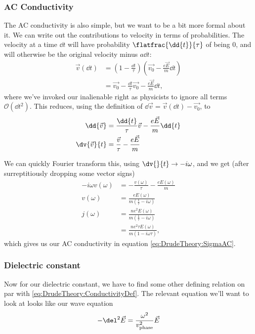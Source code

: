 \documentclass[../../main.tex]{subfiles}
\begin{document}
\subsubsection{AC Conductivity} 

The AC conductivity is also simple, but we want to be a bit more formal about it. We can write out the contributions to velocity in terms of probabilities. The velocity at a time $\dd{t}$ will have probability $\flatfrac{\dd{t}}{\tau}$ of being $0$, and will otherwise be the original velocity minus $a \dd{t}$:
\begin{align}
	\vec{v}(\dd{t}) &= \left(1 - \frac{\dd{t}}{\tau}\right) \left(\vec{v_0} - \frac{e \vec{E}}{m} \dd{t} \right) \\
	&= \vec{v_0} - \frac{\dd{t}}{\tau}\vec{v_0} - \frac{e \vec{E}}{m} \dd{t},
\end{align}
where we've invoked our inalienable right as physicists to ignore all terms $\mathcal{O}(\dd{t}^2)$.
This reduces, using the definition of $\dd{\vec{v}} = \vec{v}(\dd{t}) - \vec{v_0}$, to
\begin{align}
	\dd{\vec{v}} &=  \frac{\dd{t}}{\tau} \vec{v} - \frac{e \vec{E}}{m} \dd{t} \\
	\dv{\vec{v}}{t} &= \frac{\vec{v}}{\tau} - \frac{e \vec{E}}{m}
\end{align}

We can quickly Fourier transform this, using $\dv{}{t} \rightarrow -i \omega$, and we get (after surreptitiously dropping some vector signs)
\begin{align}
	-i \omega v(\omega) &= - \frac{v(\omega)}{\tau} - \frac{e E(\omega)}{m} \\
	v(\omega) &= \frac{e E(\omega)}{m \left(\frac{1}{\tau} - i\omega \right)} \\
	j(\omega) &= \frac{n e^2 E(\omega)}{m \left(\frac{1}{\tau} - i\omega \right)} \\
	&= \frac{n e^2 \tau E(\omega)}{m \left(1 - i\omega \tau \right)}, 
\end{align}
which gives us our AC conductivity in equation \eqref{eq:DrudeTheory:SigmaAC}.

\subsubsection{Dielectric constant}

Now for our dielectric constant, we have to find some other defining relation on par with \eqref{eq:DrudeTheory:ConductivityDef}. The relevant equation we'll want to look at looks like our wave equation
\begin{equation}
	-\del^2 \vec{E} = \frac{\omega^2}{v_{\textrm{phase}}^2} \vec{E}
\end{equation}
\end{document}

